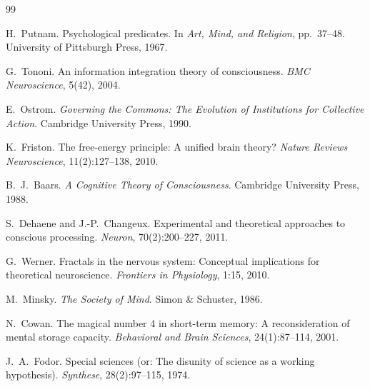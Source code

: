 \documentclass[11pt,twocolumn]{article}
\begin{document}
\begin{thebibliography}{99}

H.~Putnam.
\newblock Psychological predicates.
\newblock In \textit{Art, Mind, and Religion}, pp.~37--48. University of Pittsburgh Press, 1967.

G.~Tononi.
\newblock An information integration theory of consciousness.
\newblock \textit{BMC Neuroscience}, 5(42), 2004.

E.~Ostrom.
\newblock \textit{Governing the Commons: The Evolution of Institutions for Collective Action}.
\newblock Cambridge University Press, 1990.

K.~Friston.
\newblock The free-energy principle: A unified brain theory?
\newblock \textit{Nature Reviews Neuroscience}, 11(2):127--138, 2010.

B.~J.~Baars.
\newblock \textit{A Cognitive Theory of Consciousness}.
\newblock Cambridge University Press, 1988.

S.~Dehaene and J.-P.~Changeux.
\newblock Experimental and theoretical approaches to conscious processing.
\newblock \textit{Neuron}, 70(2):200--227, 2011.

G.~Werner.
\newblock Fractals in the nervous system: Conceptual implications for theoretical neuroscience.
\newblock \textit{Frontiers in Physiology}, 1:15, 2010.

M.~Minsky.
\newblock \textit{The Society of Mind}.
\newblock Simon \& Schuster, 1986.

N.~Cowan.
\newblock The magical number 4 in short-term memory: A reconsideration of mental storage capacity.
\newblock \textit{Behavioral and Brain Sciences}, 24(1):87--114, 2001.

J.~A.~Fodor.
\newblock Special sciences (or: The disunity of science as a working hypothesis).
\newblock \textit{Synthese}, 28(2):97--115, 1974.

\end{thebibliography}
\end{document}
